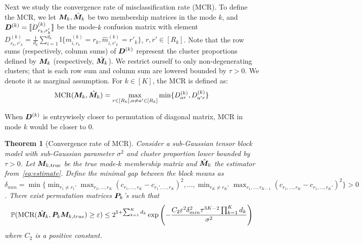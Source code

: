 \documentclass{article}
\newtheorem{theorem}{Theorem}
\begin{document}
Next we study the convergence rate of misclassification rate (MCR). To define the MCR, we let $\boldsymbol{M}_k, \hat{\boldsymbol{M}}_k$ be two membership matrices in the mode $k$, and $\boldsymbol{D}^{(k)}=\llbracket D_{r_k,r_k'}^{(k)} \rrbracket$ be the mode-$k$ confusion matrix with element $D_{r_k,r'_k}^{(k)}=\frac{1}{d_k}\sum_{i=1}^{d_k}\mathbb{I}\{m_{i,r_k}^{(k)}=r_k,\hat{m}_{i,r'_k}^{(k)}=r'_k\}$, $r,r'\in[R_k]$. Note that the row sums (respectively, column sums) of $\boldsymbol{D}^{(k)}$ represent the cluster proportions defined by $\boldsymbol{M}_k$ (respectively, $\hat{\boldsymbol{M}_k}$). We restrict ourself to only non-degenerating clusters; that is each row sum and column sum are lowered bounded by $\tau>0$. We denote it as marginal assumption. 
For $k\in[K]$, the MCR is defined as: 
\begin{equation} \label{eq:MCR}
\text{MCR}(\boldsymbol{M}_k,\hat{\boldsymbol{M}}_k) = \max_{r\in [R_k], a\neq a'\in [R_k]}\min\{D^{(k)}_{ar},D^{(k)}_{a'r}\}
\end{equation}

When $\boldsymbol{D}^{(k)}$ is entrywisely closer to permutation of diagonal matrix, MCR in mode $k$ would be closer to 0. 




\begin{theorem}[Convergence rate of MCR] \label{thm:mcr}
	Consider a sub-Gaussian tensor block model with sub-Gaussian parameter $\sigma^2$ and cluster proportion lower bounded by $\tau>0$. Let $\boldsymbol{M}_{k,\text{true}}$ be the true mode-$k$ membership matrix and $\hat {\boldsymbol{M}}_k$ the estimator from~\eqref{eq:estimate}. Define the minimal gap between the block means as $\delta_{min}=\min\{\displaystyle\min_{r_1\neq r_1'}\max_{r_2,...,r_K}(c_{r_1,...,r_K}-c_{r_1',...,r_K})^2,...,\displaystyle\min_{r_K\neq r_K'}\max_{r_1,...,r_{K-1}}(c_{r_1,...,r_K}-c_{r_1,...,r_K'})^2\}>0$. There exist permutation matrices $\boldsymbol{P}_k$'s such that
	\begin{equation} \label{eq:mcrbound}
	\mathbb{P}(\text{MCR}(\hat{\boldsymbol{M}}_k, \boldsymbol{P}_k\boldsymbol{M}_{k,true})\geq \varepsilon) \leq  2^{1+\sum_{k=1}^Kd_k}\exp{\left(-\frac{C_2\varepsilon^2\delta_{min}^2\tau^{3K-2}\prod_{k=1}^Kd_k}{\sigma^2}\right)}
	\end{equation}
	where $C_2$ is a positive constant.
\end{theorem}
\end{document}
